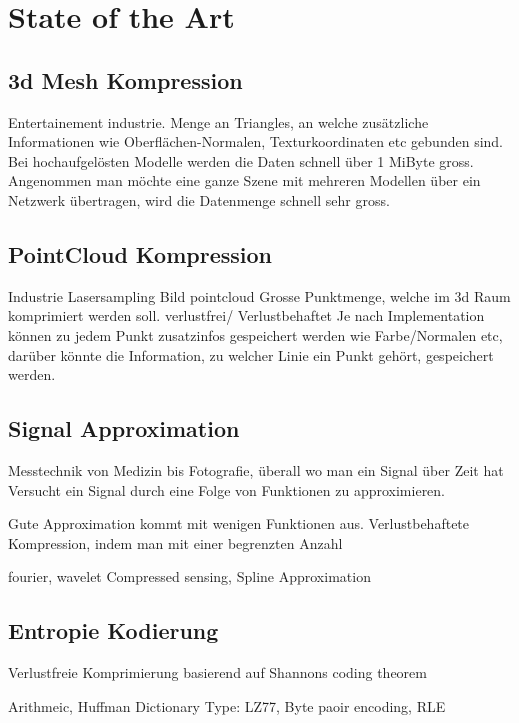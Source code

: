 \section{State of the Art}

\subsection{3d Mesh Kompression}
Entertainement industrie. Menge an Triangles, an welche zusätzliche Informationen wie Oberflächen-Normalen, Texturkoordinaten etc gebunden sind. Bei hochaufgelösten Modelle werden die Daten schnell über 1 MiByte gross. Angenommen man möchte eine ganze Szene mit mehreren Modellen über ein Netzwerk übertragen, wird die Datenmenge schnell sehr gross.

\subsection{PointCloud Kompression}
Industrie Lasersampling
Bild pointcloud
Grosse Punktmenge, welche im 3d Raum komprimiert werden soll.
verlustfrei/ Verlustbehaftet
Je nach Implementation können zu jedem Punkt zusatzinfos gespeichert werden wie Farbe/Normalen etc, darüber könnte die Information, zu welcher Linie ein Punkt gehört, gespeichert werden.

\subsection{Signal Approximation}
Messtechnik von Medizin bis Fotografie, überall wo man ein Signal über Zeit hat
Versucht ein Signal durch eine Folge von Funktionen zu approximieren.

Gute Approximation kommt mit wenigen Funktionen aus.
Verlustbehaftete Kompression, indem man mit einer begrenzten Anzahl

fourier, wavelet Compressed sensing, Spline Approximation

\subsection{Entropie Kodierung}
Verlustfreie Komprimierung basierend auf Shannons coding theorem

 Arithmeic, Huffman
Dictionary Type: LZ77, Byte paoir encoding, RLE
